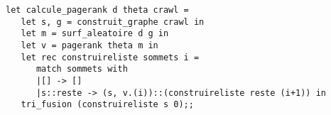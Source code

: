\begin{Answer}
\begin{lstlisting}
let calcule_pagerank d theta crawl =
   let s, g = construit_graphe crawl in
   let m = surf_aleatoire d g in
   let v = pagerank theta m in
   let rec construireliste sommets i =
      match sommets with
      |[] -> []
      |s::reste -> (s, v.(i))::(construireliste reste (i+1)) in 
   tri_fusion (construireliste s 0);;

\end{lstlisting}
\end{Answer}
